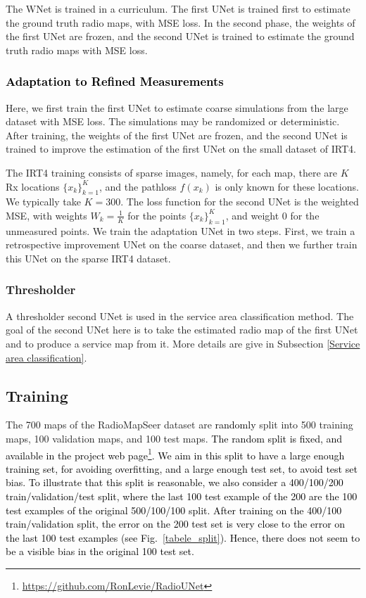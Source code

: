 \documentclass[10pt,a4paper]{article}
\begin{document}
The WNet is trained in a curriculum. The first UNet is trained first to estimate the ground truth radio maps, with MSE loss. In the second phase, the weights of the first UNet are frozen, and the second UNet is trained to estimate the ground truth radio maps with MSE loss.

\subsubsection{\textcolor{black}{Adaptation to Refined Measurements}} 
\label{Adaptation to Measurements} 
Here, we first train the first UNet to estimate coarse simulations from the large dataset with MSE loss. The simulations may be randomized or deterministic. After training, the weights of the first UNet are frozen, and the second UNet is trained to improve the estimation of the first UNet on the small dataset of IRT4.

The IRT4 training consists of sparse images, namely, for each map, there are $K$ Rx locations $\{x_k\}_{k=1}^K$, and the pathloss $f(x_k)$ is only known for these locations. We typically take $K=300$.
The loss function for the second UNet is the weighted MSE, with weights $W_k=\frac{1}{K}$ for the points $\{x_k\}_{k=1}^K$, and weight 0 for the unmeasured points. We train the adaptation UNet in two steps. First, we train a retrospective improvement UNet on the coarse dataset, and then we further train this UNet on the sparse IRT4 dataset.

\subsubsection{Thresholder} 
A thresholder second UNet is used in the service area classification method. The goal of the second UNet here is to take the estimated radio map of the first UNet and to produce a service map from it. More details are give in Subsection \ref{Service area classification}.

\subsection{Training}

The 700 maps of the RadioMapSeer dataset are \textcolor{black}{randomly} split into 500 training maps, 100 validation maps, and 100 test maps. \textcolor{black}{The random split is fixed, and available in the project web page\footnote{\url{https://github.com/RonLevie/RadioUNet}}.}
\textcolor{black}{We aim in this split to have a large enough training set, for avoiding overfitting, and a large enough test set, to avoid test set bias. To illustrate that this split is reasonable, we also consider a 400/100/200 train/validation/test split, where the last 100 test example of the 200 are the 100 test examples of the original 500/100/100 split. After training on the 400/100 train/validation split, the error on the 200 test set is very close to the error on the last 100 test examples (see Fig.~\ref{tabele_split}). Hence, there does not seem to be a visible bias in the original 100 test set.}
\end{document}
